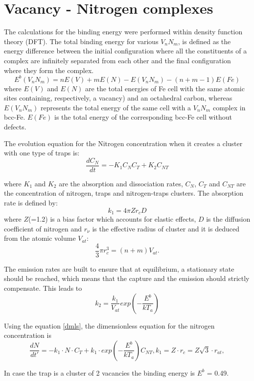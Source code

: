\documentclass[12pt,a4paper]{article}
\begin{document}
\section{Vacancy - Nitrogen complexes}

The calculations for the binding energy were performed within density function theory (DFT). The total binding energy for various $V_nN_m$, is defined as the energy difference between the initial configuration where all the constituents of a complex are infinitely separated from each other and the final configuration where they form the complex.
\begin{equation}
	E^b (V_nN_m) = nE(V) + mE(N) - E(V_nN_m) - (n+m-1)E(Fe)
\end{equation}
where $E(V)$ and $E(N)$ are the total energies of Fe cell with the same atomic sites containing, respectively, a vacancy) and an octahedral carbon, whereas $E(V_nN_m)$ represents the total energy of the same cell with a $V_nN_m$ complex in bcc-Fe. $E(Fe)$ is the total energy of the corresponding bcc-Fe cell without defects.

The evolution equation for the Nitrogen concentration when it creates a cluster with one type of traps is:
\begin{equation}
	\frac{dC_N}{dt} = -K_1 C_N C_T + K_2 C_{NT} 
\end{equation}

where $K_1$ and $K_2$ are the absorption and dissociation rates, $C_N$, $C_T$ and $C_{NT}$ are the concentration of nitrogen, traps and nitrogen-traps clusters. The absorption rate is defined by:
\begin{equation}
	k_1 = 4\pi Z r_c D
\end{equation}
where $Z$(=1.2) is a bias factor which accounts for elastic effects, $D$ is the diffusion coefficient of nitrogen and $r_\nu$ is the effective radius of cluster and it is deduced from the atomic volume $V_{at}$:
\begin{equation}
	\frac{4}{3}\pi r^3_c = (n+m) V_{at}.
\end{equation}

The emission rates are built to ensure that at equilibrium, a stationary state should be reached, which means that the capture and the emission should strictly compensate. This leads to
\begin{equation}
	k_2 = \frac{k_1}{V_{at}}exp(-\frac{E^b}{kT_a})
\end{equation}

Using the equation \ref{dmls}, the dimensionless equation for the nitrogen concentration is
\begin{equation}
	\frac{dN}{dt'} = - k_1 \cdot N \cdot C_T + k_1 \cdot exp(-\frac{E^b}{kT_a}) C_{NT}, k_1 = Z\cdot r_c = Z \sqrt{3} \cdot r_{at},
\end{equation} 

In case the trap is a cluster of 2 vacancies the binding energy is $E^b$ = 0.49.
 


\end{document}
